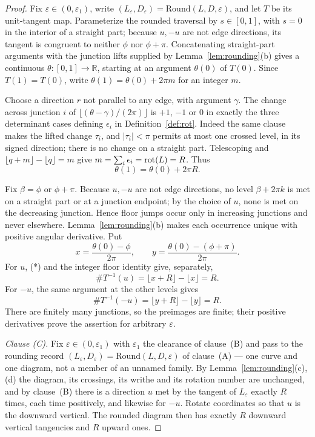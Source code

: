 \begin{proof}
Fix $\varepsilon\in(0,\varepsilon_1)$, write
$(L_\varepsilon,D_\varepsilon)=\mathrm{Round}(L,D,\varepsilon)$, and let $T$ be
its unit-tangent map. Parameterize the rounded traversal by $s\in[0,1]$, with
$s=0$ in the interior of a straight part; because $u,-u$ are not edge directions, its tangent
is congruent to neither $\phi$ nor $\phi+\pi$. Concatenating straight-part arguments
with the junction lifts supplied by Lemma~\ref{lem:rounding}(b) gives a continuous
$\theta\colon[0,1]\to\mathbb R$, starting at an argument $\theta(0)$ of $T(0)$.
Since $T(1)=T(0)$, write $\theta(1)=\theta(0)+2\pi m$ for an integer $m$.

Choose a direction $r$ not parallel to any edge, with argument $\gamma$. The
change across junction $i$ of $\lfloor(\theta-\gamma)/(2\pi)\rfloor$ is $+1$,
$-1$ or $0$ in exactly the three determinant cases defining $\epsilon_i$ in
Definition~\ref{def:rot}. Indeed the same clause makes the lifted change
$\tau_i$, and $|\tau_i|<\pi$ permits at most one crossed level, in its
signed direction; there is no change on a straight part. Telescoping and
$\lfloor q+m\rfloor-\lfloor q\rfloor=m$ give
$m=\sum_i\epsilon_i=\operatorname{rot}(L)=R$. Thus
\[
 \theta(1)=\theta(0)+2\pi R.                                  \tag{*}
\]

Fix $\beta=\phi$ or $\phi+\pi$. Because $u,-u$ are not edge directions, no
level $\beta+2\pi k$ is met on a straight part or at a junction endpoint; by
the choice of $u$, none is met on the decreasing junction. Hence floor jumps
occur only in increasing junctions and never elsewhere. Lemma~\ref{lem:rounding}(b)
makes each occurrence unique with positive angular derivative. Put
\[
 x=\frac{\theta(0)-\phi}{2\pi},\qquad
 y=\frac{\theta(0)-(\phi+\pi)}{2\pi}.
\]
For $u$, (*) and the integer floor identity give, separately,
\[
 \#T^{-1}(u)=\lfloor x+R\rfloor-\lfloor x\rfloor=R.
\]
For $-u$, the same argument at the other levels gives
\[
 \#T^{-1}(-u)=\lfloor y+R\rfloor-\lfloor y\rfloor=R.
\]
There are finitely many junctions, so the preimages are finite; their positive derivatives prove the assertion for arbitrary $\varepsilon$.

\emph{Clause (C).} Fix $\varepsilon\in(0,\varepsilon_1)$ with $\varepsilon_1$ the clearance of
clause~(B) and pass to the rounding record
$(L_\varepsilon,D_\varepsilon)=\mathrm{Round}(L,D,\varepsilon)$ of
clause~(A) --- one curve and one diagram, not a member
of an unnamed family. By Lemma~\ref{lem:rounding}(c),(d) the diagram, its
crossings, its writhe and its rotation number are unchanged, and by
clause~(B) there is a direction $u$ met by the tangent of
$L_\varepsilon$ exactly $R$ times, each time positively, and likewise for
$-u$. Rotate coordinates so
that $u$ is the downward vertical. The rounded diagram then has exactly $R$
downward vertical tangencies and $R$ upward ones.


\end{proof}
